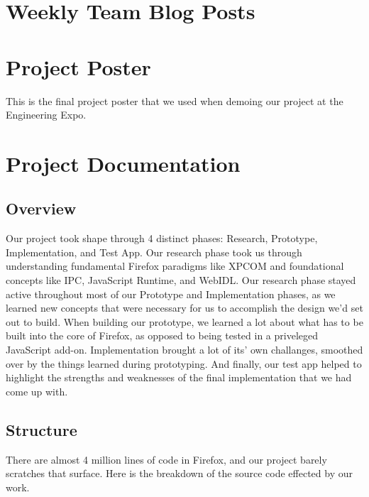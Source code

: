 \documentclass[12pt]{article}
\begin{document}
\section{Weekly Team Blog Posts}

\pagebreak

\section{Project Poster}
This is the final project poster that we used when demoing our project at the Engineering Expo.




\section{Project Documentation}
\subsection{Overview}
Our project took shape through 4 distinct phases: Research, Prototype, Implementation, and Test App. Our research phase took us through understanding fundamental Firefox paradigms like XPCOM and foundational concepts like IPC, JavaScript Runtime, and WebIDL. Our research phase stayed active throughout most of our Prototype and Implementation phases, as we learned new concepts that were necessary for us to accomplish the design we'd set out to build. When building our prototype, we learned a lot about what has to be built into the core of Firefox, as opposed to being tested in a priveleged JavaScript add-on. Implementation brought a lot of its' own challanges, smoothed over by the things learned during prototyping. And finally, our test app helped to highlight the strengths and weaknesses of the final implementation that we had come up with.
\pagebreak

\subsection{Structure}
There are almost 4 million lines of code in Firefox, and our project barely scratches that surface. Here is the breakdown of the source code effected by our work.
\end{document}
